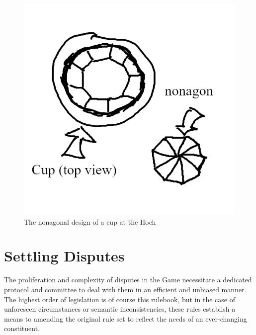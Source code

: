 \documentclass[12pt]{IEEEtran}
\begin{document}
\begin{enumerate}
\begin{figure}
\begin{center}
                \includegraphics[width=0.7\linewidth]{cup.png}
                \caption{The nonagonal design of a cup at the Hoch}
                \label{fig:cup}
            \end{center}
          \end{figure}
\end{enumerate}
\section{Settling Disputes}
The proliferation and complexity of disputes in the Game necessitate a dedicated protocol and committee to deal with them in an efficient and unbiased manner. The highest order of legislation is of course this rulebook, but in the case of unforeseen circumstances or semantic inconsistencies, these rules establish a means to amending the original rule set to reflect the needs of an ever-changing constituent.
\end{document}
